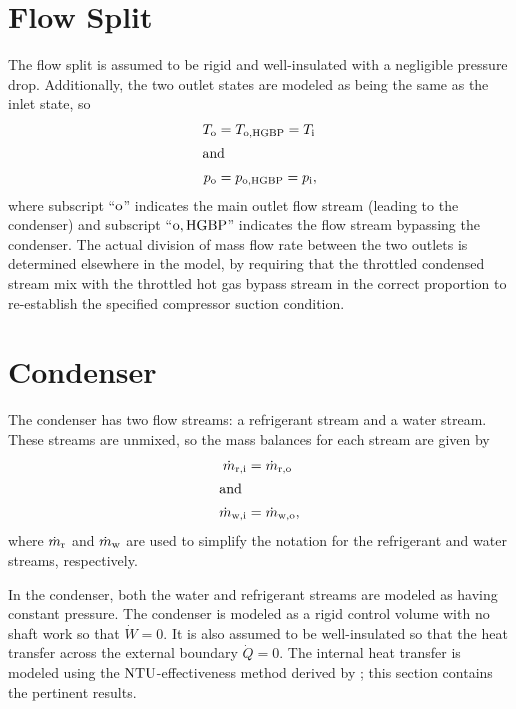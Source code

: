 \section{Flow Split} \label{sec:FlowSplit}
The flow split is assumed to be rigid and well-insulated with a negligible pressure drop.
Additionally, the two outlet states are modeled as being the same as the inlet state, so
\begin{align}
  T_{\text{o}} &= T_{\text{o},\text{HGBP}} = T_{\text{i}} \\
  \shortintertext{and}
  p_{\text{o}} &= p_{\text{o},\text{HGBP}} = p_{\text{i}},
\end{align}
where subscript ``$\text{o}$'' indicates the main outlet flow stream (leading to the condenser)
and subscript ``$\text{o},\text{HGBP}$'' indicates the flow stream bypassing the condenser.
The actual division of mass flow rate between the two outlets is determined elsewhere in the model, 
by requiring that the throttled condensed stream mix with the throttled hot gas bypass
stream in the correct proportion to re-establish the specified compressor suction condition.

\section{Condenser} \label{sec:Condenser}
The condenser has two flow streams: a refrigerant stream and a water stream.
These streams are unmixed, so the mass balances for each stream are given by
\begin{align}
  \dot{m}_{\rfr,\inl} &= \dot{m}_{\rfr,\out} \\%
  \shortintertext{and}
  \dot{m}_{\wat,\inl} &= \dot{m}_{\wat,\out}, %
\end{align}
where $\dot{m}_{\text{r}}$ and $\dot{m}_{\text{w}}$ are used to simplify the notation
for the refrigerant and water streams, respectively.

In the condenser, both the water and refrigerant streams are modeled as having constant pressure.
The condenser is modeled as a rigid control volume with no shaft work so that $\dot{W}=0$.
It is also assumed to be well-insulated so that the heat transfer across the external boundary $\dot{Q}=0$.
The internal heat transfer is modeled using the $\mathrm{NTU}$-effectiveness method 
derived by \textcite{incropera2007}; this section contains the pertinent results.

